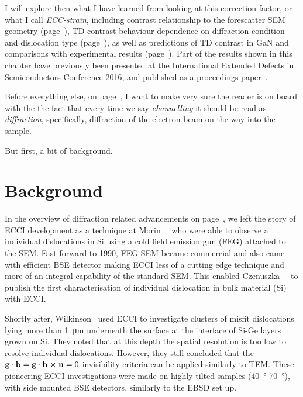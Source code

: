 I will explore then what I have learned from looking at this correction factor, or what I call \textit{ECC-strain}, including contrast relationship to the forescatter SEM geometry (page~\pageref{sec:tilteffect}), TD contrast behaviour dependence on diffraction condition and dislocation type (page~\pageref{sec:betacomparisons}), as well as predictions of TD contrast in GaN and comparisons with experimental results (page~\pageref{sec:contrastGaN}). Part of the results shown in this chapter have previously been presented at the International Extended Defects in Semiconductors Conference 2016, and published as a proceedings paper~\cite{ElenaECCI}.

Before everything else, on page~\pageref{sec:channelling}, I want to make very sure the reader is on board with the the fact that every time we say \emph{channelling} it should be read as \emph{diffraction}, specifically, diffraction of the electron beam on the way into the sample.

But first, a bit of background. 


 \section{Background}
\label{sec:ECCIbackground}


 In the overview of diffraction related advancements on page~\pageref{sec:history}, we left the story of ECCI development as a technique at Morin~\etal~\cite{Morin79} who were able to observe a individual dislocations in Si using a cold field emission gun (FEG) attached to the SEM. Fast forward to 1990, FEG-SEM became commercial and also came with efficient BSE detector making ECCI less of a cutting edge technique and more of an integral capability of the standard SEM. This enabled Czenuszka~\etal~\cite{Czernuszka90} to publish the first characterisation of individual dislocation in bulk material (Si) with ECCI.  
 
 Shortly after, Wilkinson~\cite{Wilkinson93} used ECCI to investigate clusters of misfit dislocations lying more than \SI{1}{\micro \meter} underneath the surface at the interface of Si-Ge layers grown on Si.  They noted that at this depth the spatial resolution is too low to resolve individual dislocations. However, they still concluded that the $\mathbf{g} \cdot \mathbf{b}= \mathbf{g} \cdot \mathbf{b} \boldsymbol\times \mathbf{u}=0$ invisibility criteria can be applied similarly to TEM. These pioneering ECCI investigations were made on highly tilted samples (\SI{40}{\degree}-\SI{70}{\degree}), with side mounted BSE detectors, similarly to the EBSD set up. 

